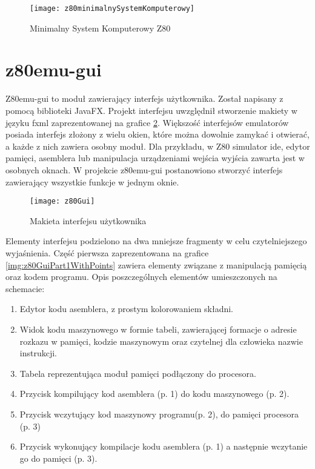 	
	\begin{figure}[h]
		\centering
		\texttt{[image: z80minimalnySystemKomputerowy]}
		\caption{Minimalny System Komputerowy Z80 \cite{eduinf}}
		\label{img:z80minimalnySystemKomputerowy}
	\end{figure}
		
	\section{z80emu-gui}
	Z80emu-gui to moduł zawierający interfejs użytkownika. Został napisany z pomocą biblioteki JavaFX. Projekt interfejsu uwzględnił stworzenie makiety w języku fxml zaprezentowanej na grafice \ref{img:z80Gui}. Większość interfejsów emulatorów posiada interfejs złożony z wielu okien, które można dowolnie zamykać i otwierać, a każde z nich zawiera osobny moduł. Dla przykładu, w Z80 simulator ide, edytor pamięci, asemblera lub manipulacja urządzeniami wejścia wyjścia zawarta jest w osobnych oknach. 
	W projekcie z80emu-gui postanowiono stworzyć interfejs zawierający wszystkie funkcje w jednym oknie. 
	
	\begin{figure}[h]
		\centering
		\texttt{[image: z80Gui]}
		\caption{Makieta interfejsu użytkownika}
		\label{img:z80Gui}
	\end{figure}
	 
	
	Elementy interfejsu podzielono na dwa mniejsze fragmenty w celu czytelniejszego wyjaśnienia. Część pierwsza zaprezentowana na grafice \ref{img:z80GuiPart1WithPoints} zawiera elementy związane z manipulacją pamięcią oraz kodem programu. Opis poszczególnych elementów umieszczonych na schemacie:
	\begin{enumerate}
		\item Edytor kodu asemblera, z prostym kolorowaniem składni.
		\item Widok kodu maszynowego w formie tabeli, zawierającej formacje o adresie rozkazu w pamięci, kodzie maszynowym oraz czytelnej dla człowieka nazwie instrukcji.
		\item Tabela reprezentująca moduł pamięci podłączony do procesora.
		\item Przycisk kompilujący kod asemblera (p. 1) do kodu maszynowego (p. 2).
		\item Przycisk wczytujący kod maszynowy programu(p. 2), do pamięci procesora (p. 3)
		\item Przycisk wykonujący kompilacje kodu asemblera (p. 1) a następnie wczytanie go do pamięci (p. 3).
	\end{enumerate}
	
